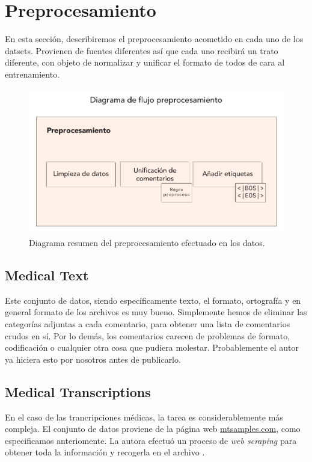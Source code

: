 \section{Preprocesamiento}
En esta sección, describiremos el preprocesamiento acometido en cada uno de los datsets. Provienen de fuentes diferentes así que cada uno recibirá un trato diferente, con objeto de normalizar y unificar el formato de todos de cara al entrenamiento.

\begin{figure}[h!]
	\centering
	\includegraphics[width=.9\textwidth]{media/preprocess-diagram.pdf}
	\caption{Diagrama resumen del preprocesamiento efectuado en los datos.}
	\label{fig:preprocess-diagram}
\end{figure}


\subsection{Medical Text}
Este conjunto de datos, siendo específicamente texto, el formato, ortografía y en general formato de los archivos es muy bueno. Simplemente hemos de eliminar las categorías adjuntas a cada comentario, para obtener una lista de comentarios crudos en sí. Por lo demás, los comentarios carecen de problemas de formato, codificación o cualquier otra cosa que pudiera molestar. Probablemente el autor ya hiciera esto por nosotros antes de publicarlo.


\subsection{Medical Transcriptions}
En el caso de las trancripciones médicas, la tarea es considerablemente más compleja. El conjunto de datos proviene de la página web \url{mtsamples.com}, como especificamos anteriomente. La autora efectuó un proceso de \textit{web scraping} para obtener toda la información y recogerla en el archivo . 

